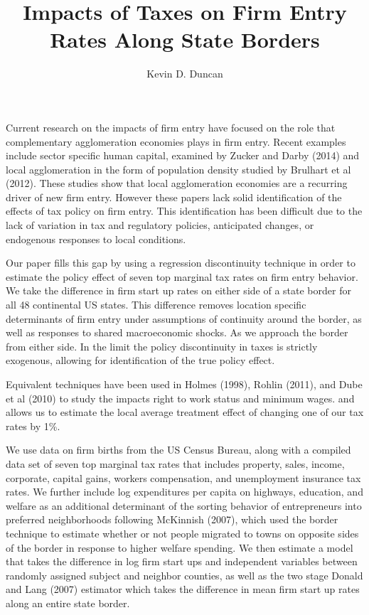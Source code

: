 \documentclass[12 pt, a4paper]{article}
\begin{document}
\title{Impacts of Taxes on Firm Entry Rates Along State Borders}
\author{Kevin D. Duncan}
\maketitle

Current research on the impacts of firm entry have focused on the role that complementary agglomeration economies plays in firm entry. Recent examples include sector specific human capital, examined by Zucker and Darby (2014) and local agglomeration in the form of population density studied by Brulhart et al (2012). These studies show that local agglomeration economies are a recurring driver of new firm entry. However these papers lack solid identification of the effects of tax policy on firm entry. This identification has been difficult due to the lack of variation in tax and regulatory policies, anticipated changes, or endogenous responses to local conditions.

Our paper fills this gap by using a regression discontinuity technique in order to estimate the policy effect of seven top marginal tax rates on firm entry behavior. We take the difference in firm start up rates on either side of a state border for all 48 continental US states. This difference removes location specific determinants of firm entry under assumptions of continuity around the border, as well as responses to shared macroeconomic shocks. As we approach the border from either side. In the limit the policy discontinuity in taxes is strictly exogenous, allowing for identification of the true policy effect. 

Equivalent techniques have been used in Holmes (1998), Rohlin (2011), and Dube et al (2010) to study the impacts right to work status and minimum wages. and allows us to estimate the local average treatment effect of changing one of our tax rates by 1\%.

We use data on firm births from the US Census Bureau, along with a compiled data set of seven top marginal tax rates that includes property, sales, income, corporate, capital gains, workers compensation, and unemployment insurance tax rates. We further include log expenditures per capita on highways, education, and welfare as an additional determinant of the sorting behavior of entrepreneurs into preferred neighborhoods following McKinnish (2007), which used the border technique to estimate whether or not people migrated to towns on opposite sides of the border in response to higher welfare spending. We then estimate a model that takes the difference in log firm start ups and independent variables between randomly assigned subject and neighbor counties, as well as the two stage Donald and Lang (2007) estimator which takes the difference in mean firm start up rates along an entire state border.
\end{document}
